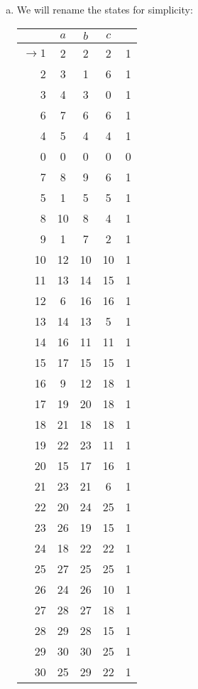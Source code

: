 \begin{solution}
\begin{enumerate}[(a)]
\begin{multicols}{2}
                The DFA is already reduced.
        \end{multicols}
    \item We will rename the states for simplicity:
    \begin{multicols}{2}
        \begin{tabular}{r|c c c r}
            & $a$ & $b$ & $c$ &\\\hline
               $\to1$ & 2 & 2 & 2 & 1\\
                2 & 3 & 1 & 6 & 1\\
                3 & 4 & 3 & 0 & 1\\
                6 & 7 & 6 & 6 & 1\\
                4 & 5 & 4 & 4 & 1\\
                0 & 0 & 0 & 0 & 0\\
                7 & 8 & 9 & 6 & 1\\
                5 & 1 & 5 & 5 & 1\\
                8 & 10 & 8 & 4 & 1\\
                9 & 1 & 7 & 2 & 1\\
                10 & 12 & 10 & 10 & 1\\
                11 & 13 & 14 & 15 & 1\\
                12 & 6 & 16 & 16 & 1\\
                13 & 14 & 13 & 5 & 1\\
                14 & 16 & 11 & 11 & 1\\
                15 & 17 & 15 & 15 & 1\\
                16 & 9 & 12 & 18 & 1\\
                17 & 19 & 20 & 18 & 1\\
                18 & 21 & 18 & 18 & 1\\
                19 & 22 & 23 & 11 & 1\\
                20 & 15 & 17 & 16 & 1\\
                21 & 23 & 21 & 6 & 1\\
                22 & 20 & 24 & 25 & 1\\
                23 & 26 & 19 & 15 & 1\\
                24 & 18 & 22 & 22 & 1\\
                25 & 27 & 25 & 25 & 1\\
                26 & 24 & 26 & 10 & 1\\
                27 & 28 & 27 & 18 & 1\\
                28 & 29 & 28 & 15 & 1\\
                29 & 30 & 30 & 25 & 1\\
                30 & 25 & 29 & 22 & 1
           \end{tabular}


\end{multicols}
\end{enumerate}
\end{solution}
